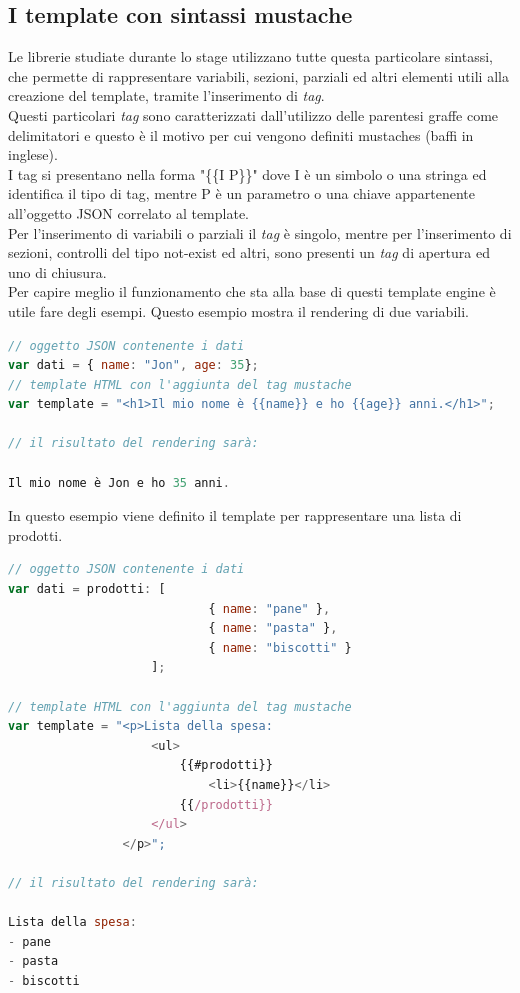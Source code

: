 \subsection{I template con sintassi mustache}
Le librerie studiate durante lo stage utilizzano tutte questa particolare sintassi, che permette di rappresentare variabili, sezioni, parziali ed altri elementi utili alla creazione del template, tramite l'inserimento di \textit{tag}.\\
Questi particolari \textit{tag} sono caratterizzati dall'utilizzo delle parentesi graffe come delimitatori e questo è il motivo per cui vengono definiti mustaches (baffi in inglese).\\
I tag si presentano nella forma "\{\{I P\}\}" dove I è un simbolo o una stringa ed identifica il tipo di tag, mentre P è un parametro o una chiave appartenente all'oggetto JSON correlato al template.\\
Per l'inserimento di variabili o parziali il \textit{tag} è singolo, mentre per l'inserimento di sezioni, controlli del tipo not-exist ed altri, sono presenti un \textit{tag} di apertura ed uno di chiusura.\\
Per capire meglio il funzionamento che sta alla base di questi template engine è utile fare degli esempi.
\newpage
Questo esempio mostra il rendering di due variabili.
\begin{lstlisting}[language=JavaScript, caption=Esempio di template rappresentante una variabile.]
// oggetto JSON contenente i dati
var dati = { name: "Jon", age: 35};
// template HTML con l'aggiunta del tag mustache
var template = "<h1>Il mio nome è {{name}} e ho {{age}} anni.</h1>";

// il risultato del rendering sarà:

Il mio nome è Jon e ho 35 anni.
\end{lstlisting}
In questo esempio viene definito il template per rappresentare una lista di prodotti.
\begin{lstlisting}[language=JavaScript, caption=Esempio di template rappresentante una sezione.]
// oggetto JSON contenente i dati
var dati = prodotti: [
    						{ name: "pane" },
    						{ name: "pasta" },
    						{ name: "biscotti" }
  					];
  					
// template HTML con l'aggiunta del tag mustache
var template = "<p>Lista della spesa:
					<ul>
						{{#prodotti}}
							<li>{{name}}</li>
						{{/prodotti}}
					</ul>
				</p>";

// il risultato del rendering sarà:

Lista della spesa:
- pane
- pasta
- biscotti
\end{lstlisting}

